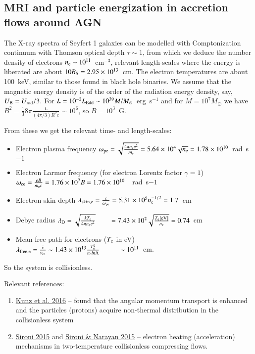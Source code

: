 \documentclass{aa}
\begin{document}
\subsection{MRI and particle energization in accretion flows around AGN} 

The X-ray spectra of Seyfert 1 galaxies can be modelled with Comptonization continuum with Thomson optical depth 
$\tau \sim 1$, from which we deduce the number density of electrons $n_{\rm e}\sim 10^{11}$~cm$^{-3}$, relevant 
length-scales where the energy is liberated are about $10R_{\rm S}=2.95\times10^{13}$~cm.
The electron temperatures are about 100~keV, similar to those found in black hole binaries.
We assume that the magnetic energy density is of the order of the radiation energy density, say, $U_{\rm B}=U_{\rm rad}/3$. 
For $L=10^{-2}L_{\rm Edd}\sim10^{39}M/M_{\odot}$~erg~s$^{-1}$ and for $M=10^7M_{\odot}$ we have 
$B^2 = \frac {1}{3} 8\pi \frac {L}{(4\pi/3) R^2 c}\sim 10^6$, so $B=10^3$~G.

From these we get the relevant time- and length-scales:
\begin{itemize}
\item Electron plasma frequency 
$\omega_{\rm pe} = \sqrt{ \frac{4\pi n_{\rm e} e^2}{m_{\rm e}} } 
                 = 5.64 \times 10^4 \sqrt{n_{\rm e}}=1.78\times10^{10}$~rad~s${-1}$
\item Electron Larmor frequency (for electron Lorentz factor $\gamma=1$)
$\omega_{\rm ce} = \frac {eB}{m_{\rm e}c} = 1.76 \times 10^7 B = 1.76\times10^{10}$~~rad~s${-1}$
\item Electron skin depth
$\lambda_{\rm skin,e} = \frac {c}{\omega_{\rm pe}} = 5.31\times10^5 n_{\rm e}^{-1/2} = 1.7$~cm
\item Debye radius
$\lambda_{\rm D} = \sqrt{ \frac {k T_{\rm e}}{4\pi n_{\rm e} e^2} } 
                 = 7.43\times10^2 \sqrt{ \frac {T_{\rm e} {\rm[eV]}}{n_{\rm e}}} = 0.74$~cm
\item Mean free path for electrons ($T_{\rm e}$ in eV)
$\lambda_{\rm free,e} = \frac {\overline{v}}{\nu_{\rm ee}} \sim 1.43\times 10^{13} \frac {T_{\rm e}^2}{n_{\rm e} ln\Lambda} 
                      \sim 10^{11}$~cm.
\end{itemize}
So the system is collisionless.



Relevant references: 
\begin{enumerate}
\item \href{http://adsabs.harvard.edu/abs/2016arXiv160807911K}{Kunz et al. 2016} -- found that the angular momentum transport  is enhanced and the particles (protons) acquire non-thermal distribution in the collisionless system
\item \href{http://adsabs.harvard.edu/abs/2015ApJ...800...89S}{Sironi 2015} 
and \href{http://adsabs.harvard.edu/abs/2015ApJ...800...88S}{Sironi \& Narayan 2015} -- electron heating (acceleration) mechanisms in two-temperature collisionless compressing flows.
\end{enumerate}
\end{document}
